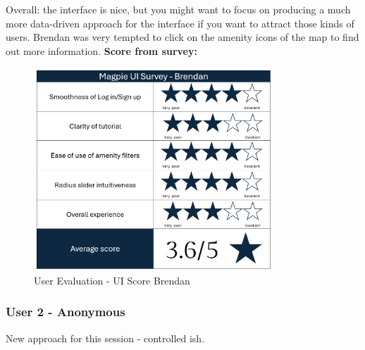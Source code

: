 Overall: the interface is nice, but you might want to focus on producing a much more data-driven approach for the interface if you want to attract those kinds of users. Brendan was very tempted to click on the amenity icons of the map to find out more information.
\textbf{Score from survey: }
\begin{figure}
    \centering
    \includegraphics[width=0.8\textwidth]{images/survey-brendan.png}
    \caption{User Evaluation - UI Score Brendan}
\end{figure}

\newpage
\subsubsection{User 2 - Anonymous}
New approach for this session - controlled ish.

\newpage
